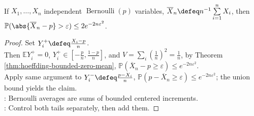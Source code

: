 \begin{corollary} \label{cor:hoeffding-bernoulli-average} \\
If $X_1,\ldots,X_n$ independent $\operatorname{Bernoulli}(p)$ variables, $\overline{X}_n\defeq n^{-1}\sum\limits_{i=1}^{n}X_i$, then $\mathbb{P}(\abs{\overline{X}_n-p}>\varepsilon)\leq2e^{-2n\varepsilon^2}$.
\begin{proof}
Set $Y_i^+\defeq\frac{X_i-p}{n}$.\\
Then $\mathbb{E}Y_i^+=0$, $Y_i^+\in[-\frac{p}{n},\frac{1-p}{n}]$, and $V=\sum\limits_i(\frac{1}{n})^2=\frac{1}{n}$, by Theorem \ref{thm:hoeffding-bounded-zero-mean}, $\mathbb{P}(\overline{X}_n-p\geq\varepsilon)\leq e^{-2n\varepsilon^2}$.\\
Apply same argument to $Y_i^-\defeq\frac{p-X_i}{n}$, $\mathbb{P}(p-\overline{X}_n\geq\varepsilon)\leq e^{-2n\varepsilon^2}$; the union bound yields the claim.\\
: Bernoulli averages are sums of bounded centered increments.\\
: Control both tails separately, then add them.
\end{proof}
\end{corollary}
